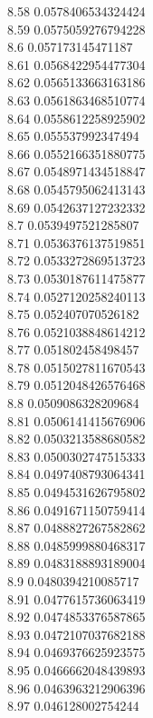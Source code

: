 {8.58	0.0578406534324424\\
8.59	0.0575059276794228\\
8.6	0.057173145471187\\
8.61	0.0568422954477304\\
8.62	0.0565133663163186\\
8.63	0.0561863468510774\\
8.64	0.0558612258925902\\
8.65	0.055537992347494\\
8.66	0.0552166351880775\\
8.67	0.0548971434518847\\
8.68	0.0545795062413143\\
8.69	0.0542637127232332\\
8.7	0.0539497521285807\\
8.71	0.0536376137519851\\
8.72	0.0533272869513723\\
8.73	0.0530187611475877\\
8.74	0.0527120258240113\\
8.75	0.052407070526182\\
8.76	0.0521038848614212\\
8.77	0.051802458498457\\
8.78	0.0515027811670543\\
8.79	0.0512048426576468\\
8.8	0.0509086328209684\\
8.81	0.0506141415676906\\
8.82	0.0503213588680582\\
8.83	0.0500302747515333\\
8.84	0.0497408793064341\\
8.85	0.0494531626795802\\
8.86	0.0491671150759414\\
8.87	0.0488827267582862\\
8.88	0.0485999880468317\\
8.89	0.0483188893189004\\
8.9	0.0480394210085717\\
8.91	0.0477615736063419\\
8.92	0.0474853376587865\\
8.93	0.0472107037682188\\
8.94	0.0469376625923575\\
8.95	0.0466662048439893\\
8.96	0.0463963212906396\\
8.97	0.046128002754244\\
}
